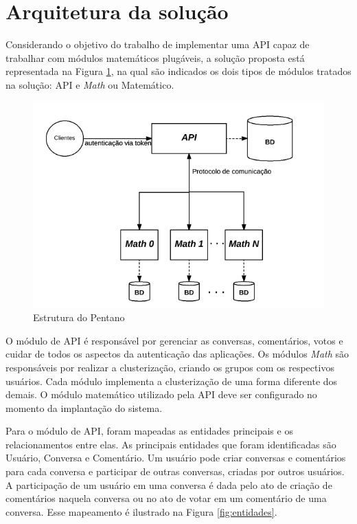 \section{Arquitetura da solução}

Considerando o objetivo do trabalho de implementar uma API capaz de trabalhar com 
módulos matemáticos plugáveis, a solução proposta está representada na Figura \ref{fig:pentano}, 
na qual são indicados os dois tipos de módulos tratados na solução: API e \textit{Math} ou Matemático.
 
\begin{figure}[h!]
\centering
\includegraphics[scale=0.7]{figuras/esquema_pentano.png}
\caption{Estrutura do Pentano}
\label{fig:pentano}
\end{figure}

O módulo de API é responsável por gerenciar as conversas, comentários, votos
e cuidar de todos os aspectos da autenticação das aplicações. Os módulos \textit{Math} são responsáveis por realizar
a clusterização, criando os grupos com os respectivos usuários. Cada módulo implementa a clusterização de uma forma diferente
dos demais. O módulo matemático utilizado pela API deve ser configurado no momento da implantação do sistema.

Para o módulo de API, foram mapeadas as entidades principais e os relacionamentos entre elas. 
As principais entidades que foram identificadas são Usuário, Conversa e Comentário. Um usuário pode criar
conversas e comentários para cada conversa e participar de outras conversas, criadas por outros usuários.
A participação de um usuário em uma conversa é dada pelo ato de criação de comentários naquela conversa ou
no ato de votar em um comentário de uma conversa. Esse mapeamento é ilustrado na Figura \ref{fig:entidades}.

